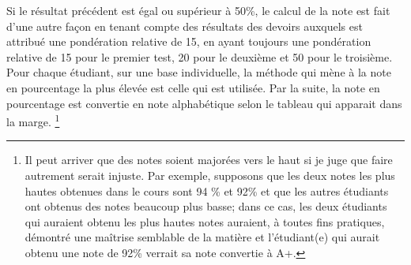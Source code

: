 \documentclass[11pt]{article}
\begin{document}

Si le résultat précédent est égal ou supérieur à 50\%, le calcul de la note est fait d'une autre
façon en tenant compte des résultats des devoirs auxquels est attribué une pondération relative de 15,
en ayant toujours une pondération relative de 15 pour le premier test, 20 pour le deuxième et 50 pour le troisième.
Pour chaque étudiant, sur une base individuelle, la méthode qui mène à la note en pourcentage la plus élevée est
celle qui est utilisée. Par la suite, la note en
pourcentage est convertie en note alphabétique selon le tableau qui apparait dans la marge.
\footnote{Il peut arriver que des notes soient majorées vers le haut si je juge que faire autrement serait injuste. Par exemple, supposons que
les deux notes les plus hautes obtenues dans le cours sont 94 \% et 92\% et que les
autres étudiants ont obtenus des notes beaucoup plus basse; dans ce cas, les deux étudiants
qui auraient obtenu les plus hautes notes auraient, à toutes fins pratiques, démontré une
maîtrise semblable de la matière et l'étudiant(e) qui
aurait obtenu une note de 92\% verrait sa note convertie à A+.}
\end{document}
